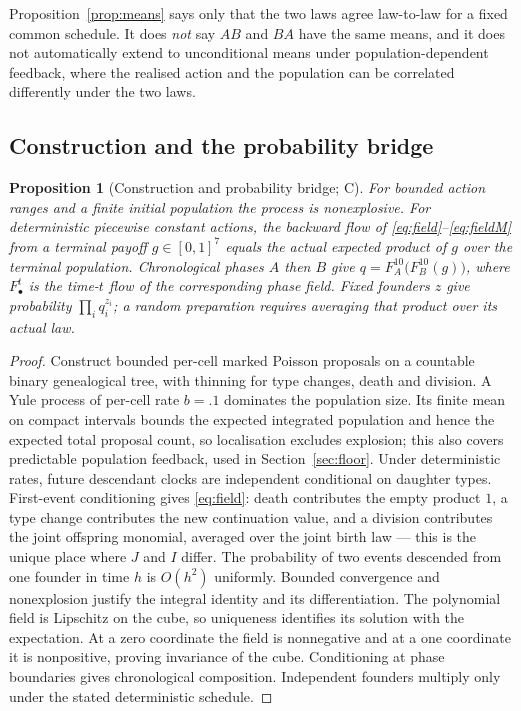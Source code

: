 \documentclass[11pt]{article}
\newtheorem{proposition}[theorem]{Proposition}
\theoremstyle{remark}
\begin{document}
Proposition~\ref{prop:means} says only that the two laws agree law-to-law for a
fixed common schedule. It does \emph{not} say $AB$ and $BA$ have the same means,
and it does not automatically extend to unconditional means under
population-dependent feedback, where the realised action and the population can
be correlated differently under the two laws.

\subsection{Construction and the probability bridge}

\begin{proposition}[Construction and probability bridge; C]\label{prop:bridge}
For bounded action ranges and a finite initial population the process is
nonexplosive. For deterministic piecewise constant actions, the backward flow of
\eqref{eq:field}--\eqref{eq:fieldM} from a terminal payoff $g\in[0,1]^7$ equals
the actual expected product of $g$ over the terminal population. Chronological
phases $A$ then $B$ give $q=F_A^{10}\bigl(F_B^{10}(g)\bigr)$, where $F^t_\bullet$
is the time-$t$ flow of the corresponding phase field. Fixed founders $z$ give
probability $\prod_iq_i^{z_i}$; a random preparation requires averaging that
product over its actual law.
\end{proposition}

\begin{proof}
Construct bounded per-cell marked Poisson proposals on a countable binary
genealogical tree, with thinning for type changes, death and division. A Yule
process of per-cell rate $b=.1$ dominates the population size. Its finite mean on
compact intervals bounds the expected integrated population and hence the
expected total proposal count, so localisation excludes explosion; this also
covers predictable population feedback, used in Section~\ref{sec:floor}. Under
deterministic rates, future descendant clocks are independent conditional on
daughter types. First-event conditioning gives \eqref{eq:field}: death
contributes the empty product $1$, a type change contributes the new
continuation value, and a division contributes the joint offspring monomial,
averaged over the joint birth law --- this is the unique place where $J$ and $I$
differ. The probability of two events descended from one founder in time $h$ is
$O(h^2)$ uniformly. Bounded convergence and nonexplosion justify the integral
identity and its differentiation. The polynomial field is Lipschitz on the cube,
so uniqueness identifies its solution with the expectation. At a zero coordinate
the field is nonnegative and at a one coordinate it is nonpositive, proving
invariance of the cube. Conditioning at phase boundaries gives chronological
composition. Independent founders multiply only under the stated deterministic
schedule.
\end{proof}
\end{document}

